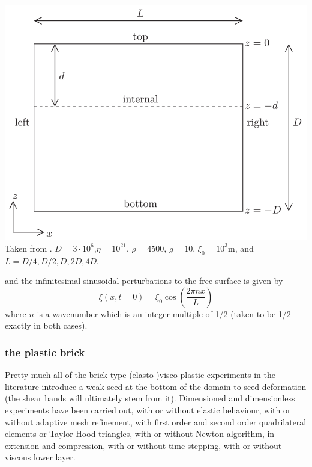 \begin{center}
\begin{minipage}{0.45\textwidth}
\includegraphics[height=0.8\textwidth]{images/benchmark_relaxation/krwd12}\\
{\small Taken from \cite{krwd12}. $D=3\cdot 10^6$,$\eta=10^{21}$, $\rho=4500$, $g=10$, $\xi_0=10^3$m, and 
$L=D/4,D/2,D,2D,4D$.}
\end{minipage}
\end{center}
and the infinitesimal sinusoidal perturbations to the free surface is given by
\[
\xi(x,t=0)=\xi_0 \cos \left( \frac{2 \pi n x}{L}  \right)
\]
where $n$ is a wavenumber which is an integer multiple of 1/2 (taken to be 1/2 exactly in both cases).


\subsubsection{the plastic brick}

\Literature \cite{hans03,moml07,lemm08,kaus10,egat10,qurj09,mishin11,maie12,spmw16,gltf18,frbt19,aspectmanual}

Pretty much all of the brick-type (elasto-)visco-plastic experiments in the literature
introduce a weak seed at the bottom of the domain to seed deformation (the shear bands
will ultimately stem from it). 
Dimensioned and dimensionless experiments have been carried out, with or without 
elastic behaviour, with or without adaptive mesh refinement, with first order and 
second order quadrilateral elements or Taylor-Hood triangles, with or without 
Newton algorithm, in extension and compression, with or without time-stepping,
with or without viscous lower layer. 


